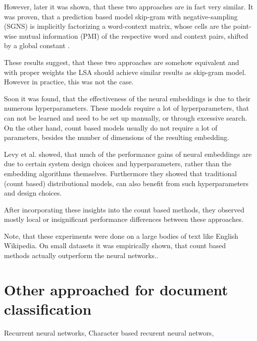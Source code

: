             However, later it was shown, that these two approaches are in fact very similar.
            It was proven, that a prediction based model skip-gram with negative-sampling (SGNS) 
            is implicitly factorizing a word-context matrix,
            whose cells are the point-wise mutual information (PMI) of the respective word and context pairs, 
            shifted by a global constant \cite{levy2014neural}. %
            
            These results suggest, that these two approaches are somehow equivalent and with proper weights the LSA should achieve similar results as skip-gram model. 
            However in practice, this was not the case.
            
            Soon it was found, that the effectiveness of the neural embeddings is due to their numerous hyperparameters.
            These models require a lot of hyperparameters, that can not be learned and need to be set up manually,
            or through excessive search.
            On the other hand, count based models usually do not require a lot of parameters, besides the number of dimensions of the resulting embedding. 
            
            Levy et al. \cite{levy2015improving} %
            showed, that much  of  the  performance  gains  of  neural embeddings  are  due  to  certain  system design  choices and hyperparameters, rather than the embedding algorithms themselves. 
            Furthermore they showed that traditional (count based) distributional models, 
            can also benefit from such hyperparameters and design choices.
            
            After incorporating these insights into the count based methods, 
            they observed mostly local or insignificant performance differences between these approaches.
            
            Note, that these experiments were done on a large bodies of text like English Wikipedia.   
            On small datasets it was empirically shown, that count based methods actually outperform the neural networks.\cite{altszyler2016comparative}. %
            
            \* \cite{naili2017comparative} %
        
    \section{Other approached for document classification}
        Recurrent neural networks,
        Character based recurent neural networs, 

